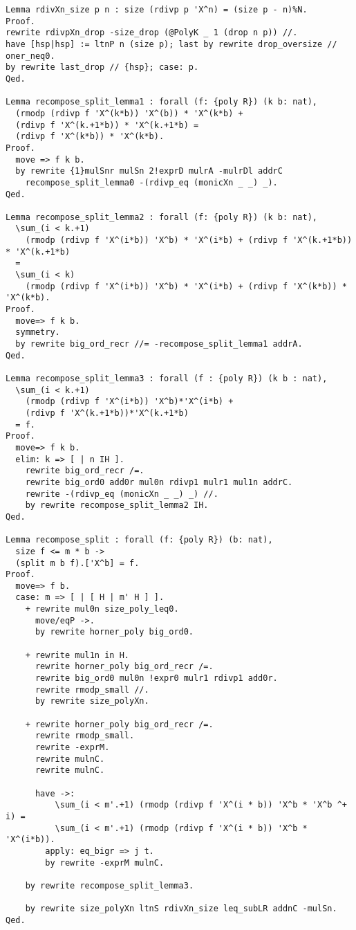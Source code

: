 \begin{lstlisting}
Lemma rdivXn_size p n : size (rdivp p 'X^n) = (size p - n)%N.
Proof.
rewrite rdivpXn_drop -size_drop (@PolyK _ 1 (drop n p)) //.
have [hsp|hsp] := ltnP n (size p); last by rewrite drop_oversize // oner_neq0.
by rewrite last_drop // {hsp}; case: p.
Qed.

Lemma recompose_split_lemma1 : forall (f: {poly R}) (k b: nat),
  (rmodp (rdivp f 'X^(k*b)) 'X^(b)) * 'X^(k*b) +
  (rdivp f 'X^(k.+1*b)) * 'X^(k.+1*b) =
  (rdivp f 'X^(k*b)) * 'X^(k*b).
Proof.
  move => f k b.
  by rewrite {1}mulSnr mulSn 2!exprD mulrA -mulrDl addrC
    recompose_split_lemma0 -(rdivp_eq (monicXn _ _) _).
Qed.

Lemma recompose_split_lemma2 : forall (f: {poly R}) (k b: nat),
  \sum_(i < k.+1)
    (rmodp (rdivp f 'X^(i*b)) 'X^b) * 'X^(i*b) + (rdivp f 'X^(k.+1*b)) * 'X^(k.+1*b)
  =
  \sum_(i < k)
    (rmodp (rdivp f 'X^(i*b)) 'X^b) * 'X^(i*b) + (rdivp f 'X^(k*b)) * 'X^(k*b).
Proof.
  move=> f k b.
  symmetry.
  by rewrite big_ord_recr //= -recompose_split_lemma1 addrA.
Qed.

Lemma recompose_split_lemma3 : forall (f : {poly R}) (k b : nat),
  \sum_(i < k.+1)
    (rmodp (rdivp f 'X^(i*b)) 'X^b)*'X^(i*b) +
    (rdivp f 'X^(k.+1*b))*'X^(k.+1*b)
  = f.
Proof.
  move=> f k b.
  elim: k => [ | n IH ].
    rewrite big_ord_recr /=.
    rewrite big_ord0 add0r mul0n rdivp1 mulr1 mul1n addrC.
    rewrite -(rdivp_eq (monicXn _ _) _) //.
    by rewrite recompose_split_lemma2 IH.
Qed.

Lemma recompose_split : forall (f: {poly R}) (b: nat),
  size f <= m * b ->
  (split m b f).['X^b] = f.
Proof.
  move=> f b.
  case: m => [ | [ H | m' H ] ].
    + rewrite mul0n size_poly_leq0.
      move/eqP ->.
      by rewrite horner_poly big_ord0.

    + rewrite mul1n in H.
      rewrite horner_poly big_ord_recr /=.
      rewrite big_ord0 mul0n !expr0 mulr1 rdivp1 add0r.
      rewrite rmodp_small //.
      by rewrite size_polyXn.

    + rewrite horner_poly big_ord_recr /=.
      rewrite rmodp_small.
      rewrite -exprM.
      rewrite mulnC.
      rewrite mulnC.

      have ->:
          \sum_(i < m'.+1) (rmodp (rdivp f 'X^(i * b)) 'X^b * 'X^b ^+ i) =
          \sum_(i < m'.+1) (rmodp (rdivp f 'X^(i * b)) 'X^b * 'X^(i*b)).
        apply: eq_bigr => j t.
        by rewrite -exprM mulnC.

    by rewrite recompose_split_lemma3.

    by rewrite size_polyXn ltnS rdivXn_size leq_subLR addnC -mulSn.
Qed.


\end{lstlisting}

